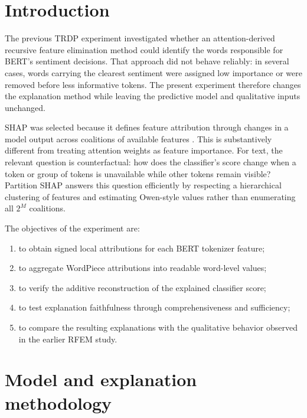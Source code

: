 \documentclass[11pt,a4paper]{article}
\begin{document}
\tableofcontents
\listoffigures
\listoftables
\clearpage
{}

\section{Introduction}

The previous TRDP experiment investigated whether an attention-derived recursive
feature elimination method could identify the words responsible for BERT's
sentiment decisions. That approach did not behave reliably: in several cases,
words carrying the clearest sentiment were assigned low importance or were removed
before less informative tokens. The present experiment therefore changes the
explanation method while leaving the predictive model and qualitative inputs
unchanged.

SHAP was selected because it defines feature attribution through changes in a
model output across coalitions of available features \cite{lundberg2017}. This is
substantively different from treating attention weights as feature importance.
For text, the relevant question is counterfactual: how does the classifier's
score change when a token or group of tokens is unavailable while other tokens
remain visible? Partition SHAP answers this question efficiently by respecting a
hierarchical clustering of features and estimating Owen-style values rather than
enumerating all \(2^M\) coalitions.

The objectives of the experiment are:

\begin{enumerate}[label=(\arabic*)]
  \item to obtain signed local attributions for each BERT tokenizer feature;
  \item to aggregate WordPiece attributions into readable word-level values;
  \item to verify the additive reconstruction of the explained classifier score;
  \item to test explanation faithfulness through comprehensiveness and sufficiency;
  \item to compare the resulting explanations with the qualitative behavior
        observed in the earlier RFEM study.
\end{enumerate}

\section{Model and explanation methodology}
\end{document}
